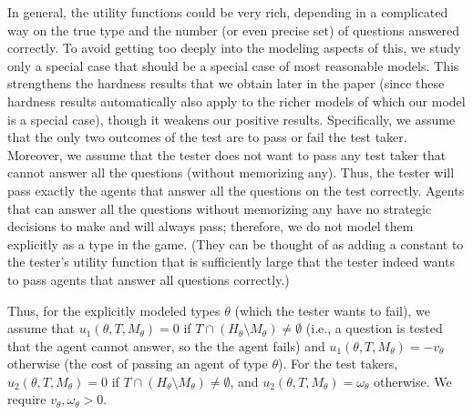 \documentclass{article}
\begin{document}
In general, the utility functions could be very rich, depending in a
complicated way on the true type and the number (or even precise set) of
questions answered correctly.  To avoid getting too deeply into the
modeling aspects of this, we study only a special case that should be a
special case of most reasonable models.  This strengthens the hardness
results that we obtain later in the paper (since these hardness results
automatically also apply to the richer models of which our model is a
special case), though it weakens our positive results.  Specifically, we
assume that the only two outcomes of the test are to pass or fail the test
taker.  Moreover, we assume that the tester does not want to pass any test
taker that cannot answer all the questions (without memorizing any).  Thus,
the tester will pass exactly the agents that answer all the questions on
the test correctly.  Agents that can answer all the questions without
memorizing any have no strategic decisions to make and will always pass;
therefore, we do not model them explicitly as a type in the game.  (They
can be thought of as adding a constant to the tester's utility function
that is sufficiently large that the tester indeed wants to pass agents that
answer all questions correctly.)  

Thus, for the explicitly modeled types
$\theta$ (which the tester wants to fail), we assume that $u_1(\theta, T,
M_\theta) = 0$ if $T \cap (H_\theta \setminus M_\theta) \neq \emptyset$
(i.e., a question is tested that the agent cannot answer, so the 
the agent fails) and $u_1(\theta, T, M_\theta) = -v_\theta$ otherwise
(the cost of passing an agent of type $\theta$).  For the test takers,
$u_2(\theta, T,
M_\theta) = 0$ if $T \cap (H_\theta \setminus M_\theta) \neq \emptyset$,
and $u_2(\theta, T, M_\theta) = \omega_\theta$ otherwise.  We require
$v_\theta, \omega_\theta >0$.


\end{document}
